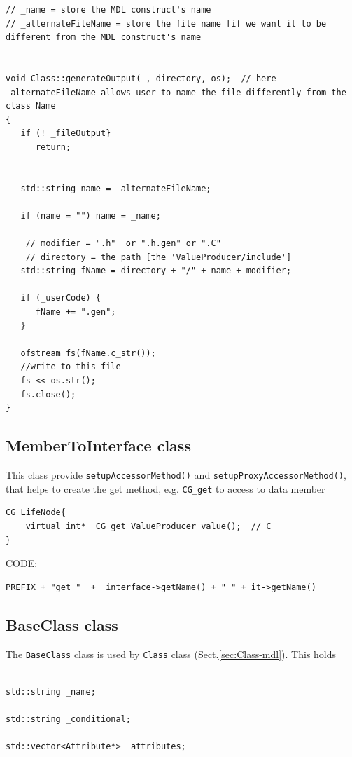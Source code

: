\begin{verbatim}
// _name = store the MDL construct's name
// _alternateFileName = store the file name [if we want it to be different from the MDL construct's name


void Class::generateOutput( , directory, os);  // here _alternateFileName allows user to name the file differently from the class Name
{
   if (! _fileOutput}
      return;


   std::string name = _alternateFileName;
   
   if (name = "") name = _name;
   
    // modifier = ".h"  or ".h.gen" or ".C"
    // directory = the path [the 'ValueProducer/include']
   std::string fName = directory + "/" + name + modifier;
   
   if (_userCode) {
      fName += ".gen";
   }
   
   ofstream fs(fName.c_str());
   //write to this file
   fs << os.str();
   fs.close();
} 
\end{verbatim}


\subsection{MemberToInterface class}
\label{sec:MemberToInterface-class}

This class provide \verb!setupAccessorMethod()! and \verb!setupProxyAccessorMethod()!, 
that helps to create the get method, e.g. \verb!CG_get! to access to data member

\begin{verbatim}
CG_LifeNode{
    virtual int*  CG_get_ValueProducer_value();  // C
}
\end{verbatim}


CODE:
\begin{lstlisting}
PREFIX + "get_"  + _interface->getName() + "_" + it->getName()
\end{lstlisting}


\subsection{BaseClass class}
\label{sec:BaseClass-mdl}

The \verb!BaseClass! class is used by \verb!Class! class (Sect.\ref{sec:Class-mdl}).
This holds
\begin{verbatim}

std::string _name;

std::string _conditional;

std::vector<Attribute*> _attributes;
\end{verbatim}


